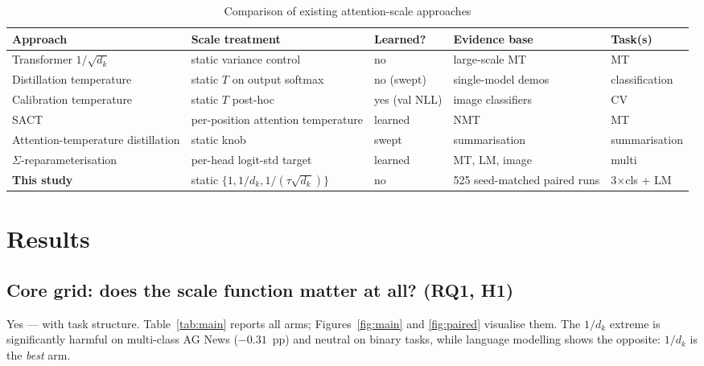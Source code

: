 \documentclass[11pt,a4paper]{article}
\begin{document}
\begin{table}[ht]
\centering\footnotesize
\caption{Comparison of existing attention-scale approaches}
\label{tab:related}
\begin{tabular}{@{}p{4.3cm}p{2.9cm}p{1.6cm}p{2.6cm}p{1.6cm}@{}}
\toprule
\textbf{Approach} & \textbf{Scale treatment} & \textbf{Learned?} & \textbf{Evidence base} & \textbf{Task(s)} \\
\midrule
Transformer $1/\sqrt{d_k}$ \cite{vaswani2017} & static variance control & no & large-scale MT & MT \\
Distillation temperature \cite{hinton2015} & static $T$ on output softmax & no (swept) & single-model demos & classification \\
Calibration temperature \cite{guo2017} & static $T$ post-hoc & yes (val NLL) & image classifiers & CV \\
SACT \cite{lin2018} & per-position attention temperature & learned & NMT & MT \\
Attention-temperature distillation \cite{zhang2022} & static knob & swept & summarisation & summarisation \\
$\Sigma$-reparameterisation \cite{zhai2023} & per-head logit-std target & learned & MT, LM, image & multi \\
\textbf{This study} & static $\{1, 1/d_k, 1/(\tau\sqrt{d_k})\}$ & no & 525 seed-matched paired runs & 3$\times$cls + LM \\
\bottomrule
\end{tabular}
\end{table}

\section{Results}

\subsection{Core grid: does the scale function matter at all? (RQ1, H1)}

Yes --- with task structure. Table~\ref{tab:main} reports all arms; Figures~\ref{fig:main} and \ref{fig:paired} visualise them. The $1/d_k$ extreme is significantly harmful on multi-class AG News ($-0.31$~pp) and neutral on binary tasks, while language modelling shows the opposite: $1/d_k$ is the \emph{best} arm.
\end{document}
